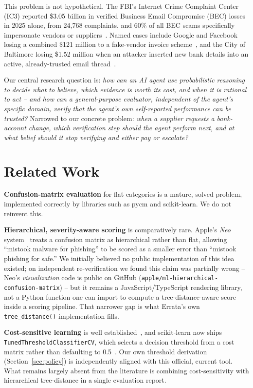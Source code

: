 \documentclass[10pt]{article}
\begin{document}
This problem is not hypothetical. The FBI's Internet Crime Complaint
Center (IC3) reported \$3.05 billion in verified Business Email
Compromise (BEC) losses in 2025 alone, from 24{,}768 complaints, and
60\% of all BEC scams specifically impersonate vendors or
suppliers~\cite{ic3bec}. Named cases include Google and Facebook losing
a combined \$121 million to a fake-vendor invoice
scheme~\cite{proofpointbec}, and the City of Baltimore losing \$1.52
million when an attacker inserted new bank details into an active,
already-trusted email thread~\cite{veridionbec}.

Our central research question is: \emph{how can an AI agent use
probabilistic reasoning to decide what to believe, which evidence is
worth its cost, and when it is rational to act -- and how can a
general-purpose evaluator, independent of the agent's specific domain,
verify that the agent's own self-reported performance can be trusted?}
Narrowed to our concrete problem: \emph{when a supplier requests a
bank-account change, which verification step should the agent perform
next, and at what belief should it stop verifying and either pay or
escalate?}

\section{Related Work}

\textbf{Confusion-matrix evaluation} for flat categories is a mature,
solved problem, implemented correctly by libraries such as
pycm and scikit-learn. We do not reinvent this.

\textbf{Hierarchical, severity-aware scoring} is comparatively rare.
Apple's \emph{Neo} system~\cite{neo2022} treats a confusion matrix as
hierarchical rather than flat, allowing ``mistook malware for
phishing'' to be scored as a smaller error than ``mistook phishing for
safe.'' We initially believed no public implementation of this idea
existed; on independent re-verification we found this claim was
partially wrong -- Neo's \emph{visualization} code is public on
GitHub (\texttt{apple/ml-hierarchical-confusion-matrix}) -- but it
remains a JavaScript/TypeScript rendering library, not a Python
function one can import to compute a tree-distance-aware score inside
a scoring pipeline. That narrower gap is what Errata's own
\texttt{tree\_distance()} implementation fills.

\textbf{Cost-sensitive learning} is well established~\cite{elkan2001},
and scikit-learn now ships
\texttt{TunedThresholdClassifierCV}, which selects a decision threshold
from a cost matrix rather than defaulting to 0.5~\cite{sklearncost}. Our
own threshold derivation (Section~\ref{sec:policy}) is independently
aligned with this official, current tool. What remains largely absent
from the literature is combining cost-sensitivity with hierarchical
tree-distance in a single evaluation report.
\end{document}
